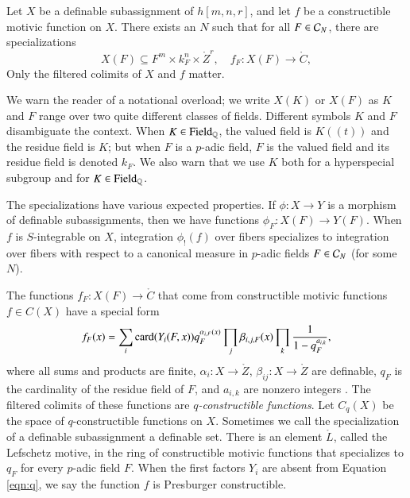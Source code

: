 Let $X$ be a definable subassignment of $h[m,n,r]$, and let $f$ be a constructible motivic function on $X$.   There exists
an $N$ such that for all $F\in \mathcal C_N$, there are specializations
\[
X(F)\subseteq F^m\times k_F^n\times \ring{Z}^r,  \quad f_F: X(F) \to\ring{C},
\]
Only the  filtered colimits of $X$ and $f$ matter.

We warn the reader of a notational overload; we write $X(K)$ or $X(F)$ as $K$ and $F$ range over two quite different
classes of fields.  Different symbols $K$ and $F$  disambiguate the context.
When $K\in {\operatorname{Field}}_{\mathbb{Q}}$, the valued field is $K((t))$ and the residue field is $K$; but when $F$ is a $p$-adic field, $F$
is the valued field and its residue field is denoted $k_F$.  We also warn that
we use $K$ both for a hyperspecial subgroup and for $K\in{\operatorname{Field}}_{\mathbb{Q}}$.

The specializations have various expected properties.
If $\phi:X\to Y$ is a morphism of definable subassignments, then we have functions $\phi_F:X(F)\to Y(F)$.
When $f$ is $S$-integrable on $X$,  integration $\phi_!(f)$ over fibers  specializes to integration over fibers 
with respect to a canonical measure in
 $p$-adic fields $F\in \mathcal C_N$ (for some $N$).


The functions $f_F:X(F)\to\ring{C}$ that come from constructible motivic functions  $f\in C(X)$ have a special form
\begin{equation}\label{eqn:q}
f_F(x) = \sum_i {\operatorname{card}}(Y_i(F,x)) q_F^{\alpha_{i,F}(x)} \prod_j \beta_{i,j,F}(x)\prod_k \frac{1}{1-q_F^{a_{i,k}}},
\end{equation}
where all sums and products are finite, $\alpha_{i}:X\to\ring{Z}$, $\beta_{ij}:X\to\ring{Z}$ are definable, $q_F$
is the  cardinality of the residue field of $F$, and $a_{i,k}$ are nonzero integers \cite[\S2]{cluckers2011btransfer}.
The filtered colimits of these functions are  {\it $q$-constructible functions}.  Let $C_q(X)$ be the space of
$q$-constructible functions on $X$.
Sometimes we call the specialization of a  definable subassignment a definable set.  
There is an element $\ring{L}$, called the Lefschetz motive, in the ring of constructible motivic functions that specializes to $q_F$
for every $p$-adic field $F$.  When the first factors $Y_i$ are absent from Equation \ref{eqn:q}, we say the function $f$
is Presburger constructible.

